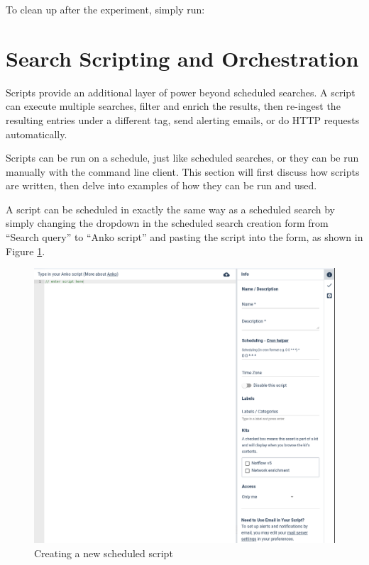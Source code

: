 To clean up after the experiment, simply run:




\section{Search Scripting and Orchestration}

Scripts provide an additional layer of power beyond scheduled
searches. A script can execute multiple searches, filter and enrich the
results, then re-ingest the resulting entries under a different tag,
send alerting emails, or do HTTP requests automatically.

Scripts can be run on a schedule, just like scheduled searches, or they
can be run manually with the command line client. This section will
first discuss how scripts are written, then delve into examples of how
they can be run and used.

A script can be scheduled in exactly the same way as a scheduled search
by simply changing the dropdown in the scheduled search creation form
from ``Search query'' to ``Anko script'' and pasting the script into the
form, as shown in Figure \ref{fig:create-soar}.

\begin{figure}
	\includegraphics{images/create-soar.png}
	\caption{Creating a new scheduled script}
	\label{fig:create-soar}
\end{figure}

